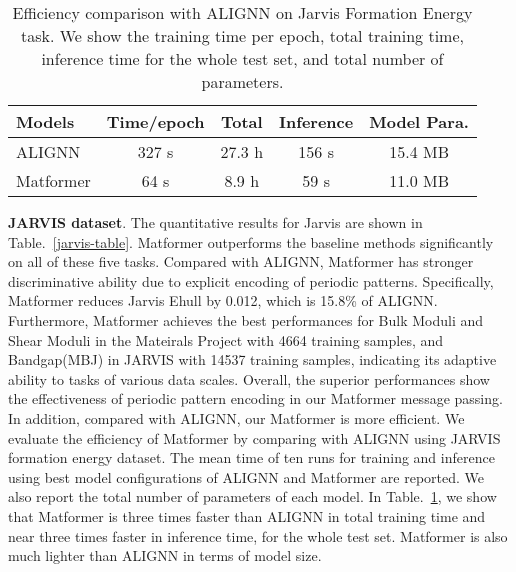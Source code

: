 \documentclass{article}
\begin{document}
\begin{table}
  \caption{Efficiency comparison with ALIGNN on Jarvis Formation Energy task. We show the training time per epoch, total training time, inference time for the whole test set, and total number of parameters.}
  \label{tab:efficient}
  \centering
  \begin{tabular}{lcccc}
    \toprule
    Models & Time/epoch & Total & Inference & Model Para. \\
    \midrule
    ALIGNN  &  327 s &  27.3 h &  156 s &  15.4 MB\\
    Matformer  &  64 s &  8.9 h &  59 s &  11.0 MB\\
    \bottomrule
  \end{tabular}
  \vspace{-3mm}
\end{table}
\textbf{JARVIS dataset}. The quantitative results for Jarvis are shown in Table.~\ref{jarvis-table}. Matformer outperforms the baseline methods significantly on all of these five tasks.
Compared with ALIGNN, Matformer has stronger discriminative ability due to explicit encoding of periodic patterns. Specifically, Matformer reduces Jarvis Ehull by 0.012, which is 15.8\% of ALIGNN. 
Furthermore, Matformer achieves the best performances for Bulk Moduli and Shear Moduli in the Mateirals Project with  4664 training samples, and Bandgap(MBJ) in JARVIS with 14537 training samples, indicating its adaptive ability to tasks of various data scales.
Overall, the superior performances show the effectiveness of periodic pattern encoding in our Matformer message passing.
In addition, compared with ALIGNN, our Matformer is more efficient. We evaluate the efficiency of Matformer by comparing with ALIGNN using JARVIS formation energy dataset. The mean time of ten runs for training and inference using best model configurations of ALIGNN and Matformer are reported. We also report the total number of parameters of each model.
In Table.~\ref{tab:efficient}, we show that Matformer is three times faster than ALIGNN in total training time and near three times faster in inference time, for the whole test set. Matformer is also much lighter than ALIGNN in terms of model size.
\end{document}
